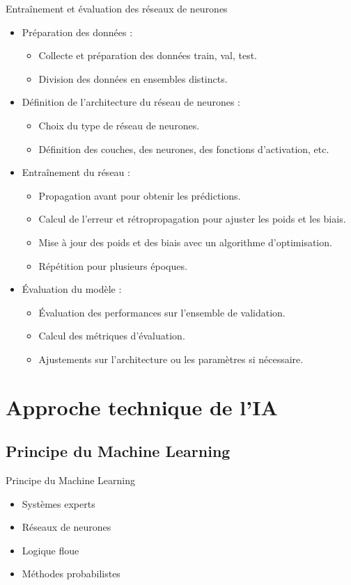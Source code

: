 \documentclass{beamer}
\begin{document}
\begin{frame}{Entraînement et évaluation des réseaux de neurones }
	\begin{itemize}
		\item Préparation des données :
		\begin{itemize}
			\item Collecte et préparation des données train, val, test.
			\item Division des données en ensembles distincts.
		\end{itemize}
		
		\item Définition de l'architecture du réseau de neurones :
		\begin{itemize}
			\item Choix du type de réseau de neurones.
			\item Définition des couches, des neurones, des fonctions d'activation, etc.
		\end{itemize}
		
		\item Entraînement du réseau :
		\begin{itemize}
			\item Propagation avant pour obtenir les prédictions.
			\item Calcul de l'erreur et rétropropagation pour ajuster les poids et les biais.
			\item Mise à jour des poids et des biais avec un algorithme d'optimisation.
			\item Répétition pour plusieurs époques.
		\end{itemize}
		
		\item Évaluation du modèle :
		\begin{itemize}
			\item Évaluation des performances sur l'ensemble de validation.
			\item Calcul des métriques d'évaluation.
			\item Ajustements sur l'architecture ou les paramètres si nécessaire.
		\end{itemize}
	\end{itemize}
\end{frame}




	\section{Approche technique de l'IA}
	\subsection{Principe du Machine Learning}
\begin{frame}{Principe du Machine Learning}
	\begin{itemize}
		\item Systèmes experts
		\item Réseaux de neurones
		\item Logique floue
		\item Méthodes probabilistes
	\end{itemize}
\end{frame}
\end{document}
